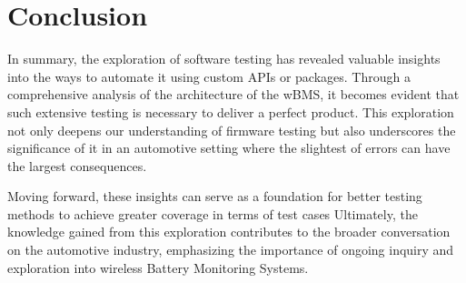 \chapter{Conclusion} %

\label{ch:conc}


In summary, the exploration of software testing has revealed valuable insights into the ways to automate it using custom APIs or packages. 
Through a comprehensive analysis of the architecture of the wBMS, it becomes evident that such extensive testing is necessary to deliver a perfect product. 
This exploration not only deepens our understanding of firmware testing but also underscores the significance of it in an automotive setting where the slightest of errors can have the largest consequences. 

Moving forward, these insights can serve as a foundation for better testing methods to achieve greater coverage in terms of test cases 
Ultimately, the knowledge gained from this exploration contributes to the broader conversation on the automotive industry, emphasizing the importance of ongoing inquiry and exploration into wireless Battery Monitoring Systems.